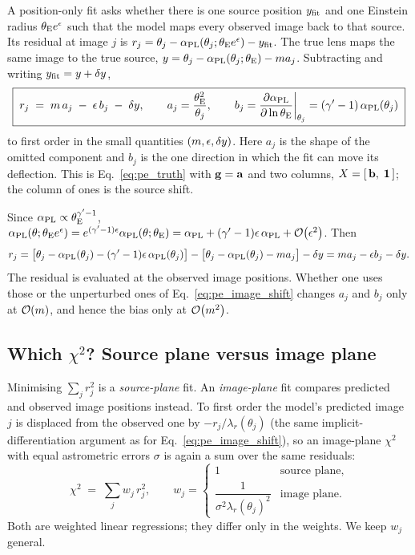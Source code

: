 A position-only fit asks whether there is one source position
$y_{\rm fit}$ and one Einstein radius $\theta_{\mathrm{E}} e^{\epsilon}$ such
that the model maps every observed image back to that source. Its
residual at image $j$ is
$r_j=\theta_j-\alpha_{\rm PL}(\theta_j;\theta_{\mathrm{E}} e^{\epsilon})-y_{\rm fit}$.
The true lens maps the same image to the true source,
$y=\theta_j-\alpha_{\rm PL}(\theta_j;\theta_{\mathrm{E}})-m a_j$. Subtracting
and writing $y_{\rm fit}=y+\delta y$,
\begin{equation}
    \boxed{\;
    r_j \;=\; m\,a_j \;-\;\epsilon\,b_j\;-\;\delta y ,
    \qquad
    a_j=\frac{\theta_{\mathrm{E}}^2}{\theta_j},\qquad
    b_j=\frac{\partial \alpha_{\rm PL}}{\partial \ln\theta_{\mathrm{E}}}\bigg|_{\theta_j}
       =(\gamma'-1)\,\alpha_{\rm PL}(\theta_j)\;}
    \label{eq:pe_residual}
\end{equation}
to first order in the small quantities $(m,\epsilon,\delta y)$.
Here $a_j$ is the shape of the omitted component and $b_j$ is the one
direction in which the fit can move its deflection. This is
Eq.~\eqref{eq:pe_truth} with $\vb{g}=\vb{a}$ and two columns,
$X=[\,\vb{b},\;\vb{1}\,]$; the column of ones is the source shift.

\begin{derivation}
Since $\alpha_{\rm PL}\propto\theta_{\mathrm{E}}^{\gamma'-1}$,
$\alpha_{\rm PL}(\theta;\theta_{\mathrm{E}} e^{\epsilon})=e^{(\gamma'-1)\epsilon}\alpha_{\rm PL}(\theta;\theta_{\mathrm{E}})
=\alpha_{\rm PL}+(\gamma'-1)\epsilon\,\alpha_{\rm PL}+\mathcal{O}\!\left(\epsilon^2\right)$.
Then
\[
r_j=\bigl[\theta_j-\alpha_{\rm PL}(\theta_j)-(\gamma'-1)\epsilon\,\alpha_{\rm PL}(\theta_j)\bigr]
-\bigl[\theta_j-\alpha_{\rm PL}(\theta_j)-m a_j\bigr]-\delta y
=m a_j-\epsilon b_j-\delta y .
\]
The residual is evaluated at the observed image positions.
Whether one uses those or the unperturbed ones of
Eq.~\eqref{eq:pe_image_shift} changes $a_j$ and $b_j$ only at
$\mathcal{O}\!\left(m\right)$, and hence the bias only at $\mathcal{O}\!\left(m^2\right)$.
\end{derivation}

\subsection{Which $\chi^2$? Source plane versus image plane}

Minimising $\sum_j r_j^2$ is a \emph{source-plane} fit. An
\emph{image-plane} fit compares predicted and observed image positions
instead. To first order the model's predicted image $j$ is displaced
from the observed one by $-r_j/\lambda_r(\theta_j)$ (the same
implicit-differentiation argument as for
Eq.~\eqref{eq:pe_image_shift}), so an image-plane $\chi^2$ with equal
astrometric errors $\sigma$ is again a sum over the same residuals:
\begin{equation}
    \chi^2 \;=\; \sum_j w_j\,r_j^2,
    \qquad
    w_j=
    \begin{cases}
      1 & \text{source plane},\\[2pt]
      \dfrac{1}{\sigma^2\lambda_r(\theta_j)^2} & \text{image plane}.
    \end{cases}
    \label{eq:pe_chi2}
\end{equation}
Both are weighted linear regressions; they differ only in the weights.
We keep $w_j$ general.

